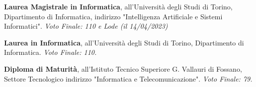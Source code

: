 
\begin{scholarship}
	{\textbf{Laurea Magistrale in Informatica},  all'Università degli Studi di Torino, Dipartimento di Informatica, indirizzo "Intelligenza Artificiale e Sistemi Informatici". \textit{Voto Finale: 110 e Lode (il 14/04/2023)}}
					
	{\textbf{Laurea in Informatica}, all'Università degli Studi di Torino, Dipartimento di Informatica. \textit{Voto Finale: 110.}}
						
	{\textbf{Diploma di Maturità}, all'Istituto Tecnico Superiore G. Vallauri di Fossano, Settore Tecnologico indirizzo "Informatica e Telecomunicazione". \textit{Voto Finale: 79.}}
		
\end{scholarship}